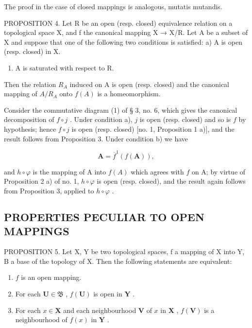 The proof in the case of closed mappings is analogous, mutatis mutandis.

PROPOSITION 4. Let R be an open (resp. closed) equivalence relation on a topological space X, and f the canonical mapping X → X/R. Let A be a subset of X and suppose that one of the following two conditions is satisfied: a) A is open (resp. closed) in X.

\begin{enumerate}
\def\labelenumi{\alph{enumi})}
\setcounter{enumi}{1}
\tightlist
\item
  A is saturated with respect to R.
\end{enumerate}

Then the relation \(R_{A}\) induced on A is open (resp. closed) and the canonical mapping of \(A/R_{A}\) onto \(f(A)\) is a homeomorphism.

Consider the commutative diagram (1) of § 3, no. 6, which gives the canonical decomposition of \(f \circ j\) . Under condition a), \(j\) is open (resp. closed) and so is \(f\) by hypothesis; hence \(f \circ j\) is open (resp. closed) {[}no. 1, Proposition 1 a){]}, and the result follows from Proposition 3. Under condition b) we have

\[
\mathbf {A} = \overline {{{f}}} ^ {1} (f (\mathbf {A})),
\]

and \(h \circ \varphi\) is the mapping of A into \(f(A)\) which agrees with \(f\) on A; by virtue of Proposition 2 a) of no. 1, \(h \circ \varphi\) is open (resp. closed), and the result again follows from Proposition 3, applied to \(h \circ \varphi\) .

\subsection{PROPERTIES PECULIAR TO OPEN MAPPINGS}

PROPOSITION 5. Let X, Y be two topological spaces, f a mapping of X into Y, B a base of the topology of X. Then the following statements are equivalent:

\begin{enumerate}
\def\labelenumi{\alph{enumi})}
\item
  \(f\) is an open mapping.
\item
  For each \(\mathbf{U} \in \mathfrak{B}\) , \(f(\mathbf{U})\) is open in \(\mathbf{Y}\) .
\item
  For each \(x \in \mathbf{X}\) and each neighbourhood \(\mathbf{V}\) of \(x\) in \(\mathbf{X}\) , \(f(\mathbf{V})\) is a neighbourhood of \(f(x)\) in \(\mathbf{Y}\) .
\end{enumerate}

